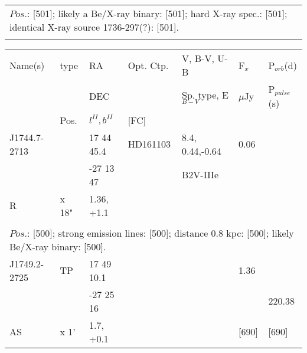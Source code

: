 \documentclass{aa}
\begin{document}
\begin{table*}[h]
\begin{tabular}{p{2.5cm}p{1cm}p{1.8cm}p{2.3cm}p{3.3cm}p{2.0cm}p{2.2cm}}
\\
\multicolumn{7}{p{17.5cm}}{
$Pos$.: [501]; likely a Be/X-ray binary: [501]; hard X-ray spec.: [501]; identical X-ray source 1736-297(?): [501].}\\

\noalign{\smallskip}
\hline
\end{tabular}
\end{table*}

\clearpage\begin{table*}[h]
\begin{tabular}{p{2.5cm}p{1cm}p{1.8cm}p{2.3cm}p{3.3cm}p{2.0cm}p{2.2cm}}
\noalign{\smallskip}
\multicolumn{7}{p{17.5cm}}{Table 1.  (continued) }\\        
\hline
\noalign{\smallskip}
Name(s)      & type  & RA                       &  Opt. Ctp. & V, B-V, U-B                    &   F$_{x}$           & P$_{orb}$(d)    \\
                      &            &  DEC                   &                     &  Sp. type, E$_{B-V}$  &    $\mu$Jy        & P$_{pulse}$(s) \\
                      & Pos.  &  $l^{II}, b^{II}$     &  [FC]           &                                          &                            &                             \\
\noalign{\smallskip} 
\hline
\noalign{\smallskip}
J1744.7-2713 &            &   17 44 45.4 & HD161103    & 8.4, 0.44,-0.64 & 0.06       & \\
                          &            &  -27 13 47    &                         &  B2V-IIIe          &                & \\
R                       &  x 18" & 1.36, +1.1    &                         &                           &                &  \\
  
\\
\multicolumn{7}{p{17.5cm}}{
$Pos$.: [500]; strong emission lines: [500]; distance 0.8 kpc: [500]; likely Be/X-ray binary: [500].  }\\

\noalign{\smallskip}
\hline
\noalign{\smallskip}
J1749.2-2725 &  TP     & 17 49 10.1  &               &                   &  1.36         &                \\      
                          &            & -27 25 16   &               &                   &                    & 220.38    \\     
AS                    &   x 1'   &  1.7, +0.1    &              &                    &  [690]        &      [690]  \\
  

\end{tabular}
\end{table*}
\end{document}
